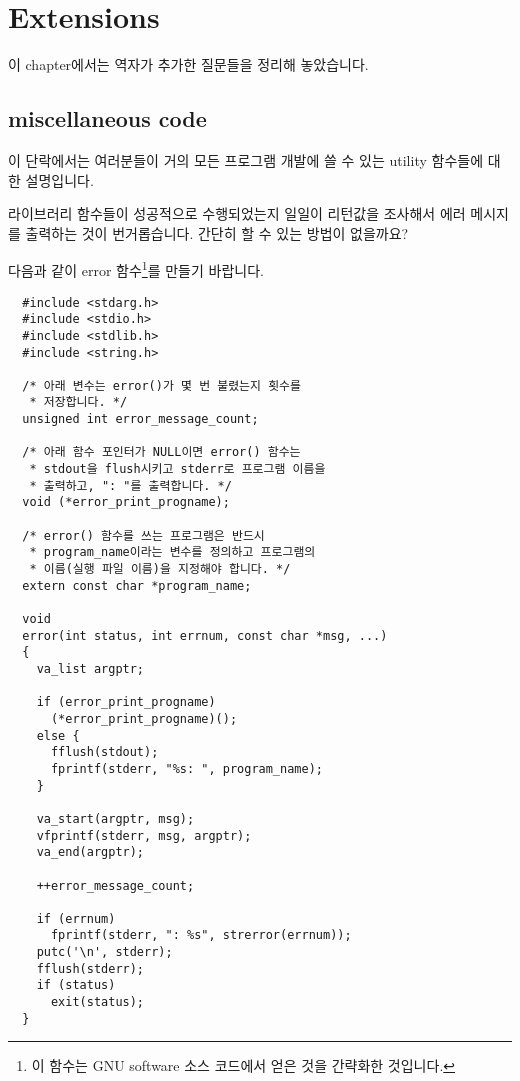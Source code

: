 \chapter{Extensions}	\label{chap:ext}

이 chapter에서는 역자가 추가한 질문들을 정리해 놓았습니다.

\section{miscellaneous code}	\label{sec:misccode}
이 단락에서는 여러분들이 거의 모든 프로그램 개발에 쓸 수 있는 utility
함수들에 대한 설명입니다.

\begin{faq}	\label{faq:error}
	라이브러리 함수들이 성공적으로 수행되었는지 일일이 리턴값을 조사해서
	에러 메시지를 출력하는 것이 번거롭습니다. 간단히 할 수 있는 방법이
	없을까요?

\A
	다음과 같이 error 함수\footnote{이  함수는 GNU software
	소스 코드에서 얻은 것을 간략화한 것입니다.}를 만들기 바랍니다.

\begin{verbatim}
  #include <stdarg.h>
  #include <stdio.h>
  #include <stdlib.h>
  #include <string.h>

  /* 아래 변수는 error()가 몇 번 불렸는지 횟수를 
   * 저장합니다. */
  unsigned int error_message_count;

  /* 아래 함수 포인터가 NULL이면 error() 함수는 
   * stdout을 flush시키고 stderr로 프로그램 이름을
   * 출력하고, ": "를 출력합니다. */
  void (*error_print_progname);
    
  /* error() 함수를 쓰는 프로그램은 반드시
   * program_name이라는 변수를 정의하고 프로그램의
   * 이름(실행 파일 이름)을 지정해야 합니다. */
  extern const char *program_name;

  void
  error(int status, int errnum, const char *msg, ...)
  {
    va_list argptr;
    
    if (error_print_progname)
      (*error_print_progname)();
    else {
      fflush(stdout);
      fprintf(stderr, "%s: ", program_name);
    }
    
    va_start(argptr, msg);
    vfprintf(stderr, msg, argptr);
    va_end(argptr);
    
    ++error_message_count;
     
    if (errnum)
      fprintf(stderr, ": %s", strerror(errnum));
    putc('\n', stderr);
    fflush(stderr);
    if (status)
      exit(status);
  }
\end{verbatim}


\end{faq}

